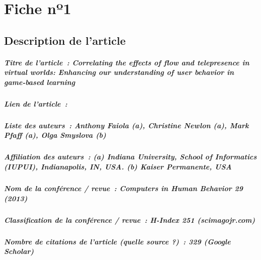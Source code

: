 
\chapter{Fiche nº1} %
\label{app:Fiche1} %

\section{Description de l'article}

\paragraph{Titre de l'article~: Correlating the effects of ﬂow and telepresence in virtual worlds: Enhancing
our understanding of user behavior in game-based learning}
\paragraph{Lien de l'article~:}
\paragraph{Liste des auteurs~: Anthony Faiola (a), Christine Newlon (a), Mark Pfaff (a), Olga Smyslova (b)}
\paragraph{Affiliation des auteurs~: (a) Indiana University, School of Informatics (IUPUI), Indianapolis, IN, USA.
(b) Kaiser Permanente, USA}
\paragraph{Nom de la conférence / revue~: Computers in Human Behavior 29 (2013)}
\paragraph{Classification de la conférence / revue~: H-Index 251 (scimagojr.com)}
\paragraph{Nombre de citations de l'article (quelle source ?)~: 329 (Google Scholar)}



